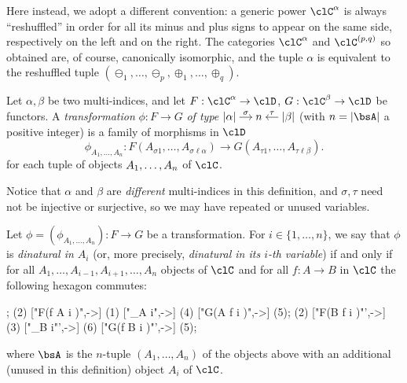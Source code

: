 \documentclass[11pt]{amsart}
\begin{document}
Here instead, we adopt a different convention: a generic power \(\clC^\alpha\) is always ``reshuffled'' in order for all its minus and plus signs to appear on the same side, respectively on the left and on the right. The categories \(\clC^\alpha\) and \(\pq{\clC}\) so obtained are, of course, canonically isomorphic, and the tuple \(\alpha\) is equivalent to the reshuffled tuple \((\ominus_1,\dots,\ominus_p,\oplus_1,\dots,\oplus_q)\).

\begin{definition}\label{def:transformation}
	Let $\alpha,\beta$ be two multi-indices, and let $F : \clC^\alpha \to \clD$, $G : \clC^\beta \to \clD$ be functors. A \emph{transformation} $\phi : F \to G$ \emph{of type}
	$
		\begin{tikzcd}[cramped,sep=small]
			\ell\alpha \ar[r,"\sigma"] & n & \ell\beta \ar[l,"\tau"']
		\end{tikzcd}
	$
	(with $n = \ell \bsA$ a positive integer) is a family of morphisms in $\clD$
	\[ 
		\phi_{A_1,\dots,A_n} : F(A_{\sigma 1}, \dots, A_{\sigma\ell\alpha}) \to G(A_{\tau1},\dots,A_{\tau\ell\beta}).
		\]
		for each tuple of objects $\tpl{A}$ of $\clC$.
	\end{definition}

Notice that \(\alpha\) and \(\beta\) are \emph{different} multi-indices in this definition, and \(\sigma,\tau\) need not be injective or surjective, so we may have repeated or unused variables.
\begin{definition}\label{def:dinaturality in i-th variable}
	Let $\phi = (\phi_{A_1,\dots,A_n}) : F \to G$ be a transformation. For $i \in \{1,\dots,n\}$, we say that $\phi$ is \emph{dinatural in $A_i$} (or, more precisely, \emph{dinatural in its $i$-th variable}) if and only if for all $A_1,\dots,A_{i-1}, A_{i+1},\dots,A_n$ objects of $\clC$ and for all $f : A \to B$ in $\clC$ the following hexagon commutes:

	{\footnotesize
	\begin{center}
		\begin{codi}
			;
			\mor (2) ["F(\substMV \bsA f A i \sigma)",->] (1) ["\phi_{\subst \bsA A i}",->]  (4) ["G(\substMV \bsA A f i \tau)",->] (5);
			\mor (2) ["F(\substMV \bsA B f i \sigma)"',->] (3) ["\phi_{\subst \bsA B i}"',->] (6) ["G(\substMV \bsA f B i \tau)"',->] (5);
		\end{codi}
	\end{center}
	}
	where $\bsA$ is the $n$-tuple $(A_1,\dots,A_n)$ of the objects above with an additional (unused in this definition) object $A_i$ of $\clC$.
\end{definition}
\end{document}
